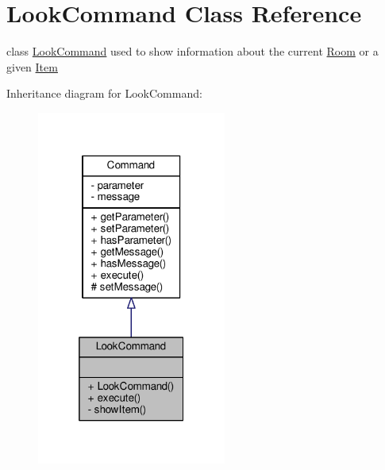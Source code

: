 \hypertarget{classLookCommand}{\section{Look\-Command Class Reference}
\label{classLookCommand}
}


class \hyperlink{classLookCommand}{Look\-Command} used to show information about the current \hyperlink{classRoom}{Room} or a given \hyperlink{classItem}{Item}  




Inheritance diagram for Look\-Command\-:
\nopagebreak
\begin{figure}[H]
\begin{center}
\leavevmode
\includegraphics[width=176pt]{classLookCommand__inherit__graph}
\end{center}
\end{figure}


